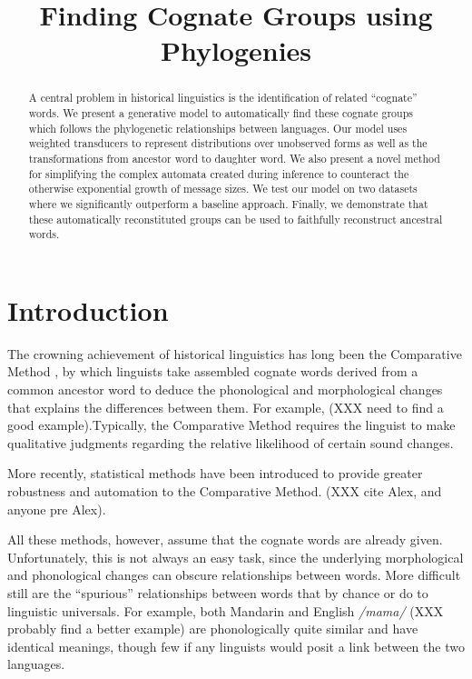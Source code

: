 \documentclass[11pt,a4paper]{article}
\title{Finding Cognate Groups using Phylogenies}
\author{}
\date{}
\begin{document}
\maketitle
\begin{abstract}
  A central problem in historical linguistics is the identification
  of related ``cognate'' words. We present a generative model to
  automatically find these cognate groups which follows the
  phylogenetic relationships between languages. Our model uses
  weighted transducers to represent distributions over unobserved
  forms as well as the transformations from ancestor word to daughter
  word. We also present a novel method for simplifying the complex
  automata created during inference to counteract the otherwise
  exponential growth of message sizes. We test our model on two
  datasets where we significantly outperform a baseline approach.
  Finally, we demonstrate that these automatically reconstituted
  groups can be used to faithfully reconstruct ancestral words.
\end{abstract}
\section{Introduction}

The crowning achievement of historical linguistics has long been
the Comparative Method \cite{ohala93phonetics}, by which
linguists take assembled cognate words derived from a common ancestor
word to deduce the phonological and morphological changes that
explains the differences between them. For example, (XXX need to
find a good example).Typically, the Comparative Method requires
the linguist to make qualitative judgments regarding the relative
likelihood of certain sound changes.

More recently, statistical methods have been introduced to provide
greater robustness and automation to the Comparative Method. (XXX cite
Alex, and anyone pre Alex). 

All these methods, however, assume that the cognate words are already
given. Unfortunately, this is not always an easy task, since the
underlying morphological and phonological changes can obscure
relationships between words.  More difficult still are the ``spurious''
relationships between words that by chance or do to linguistic
universals. For example, both Mandarin and English \textit{/mama/}
(XXX probably find a better example) are phonologically quite similar
and have identical meanings, though few if any linguists would posit
a link between the two languages.
\end{document}
